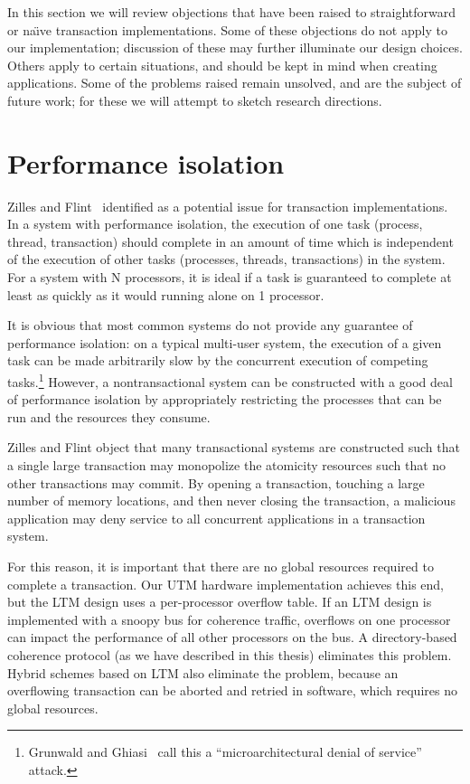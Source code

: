 In this section we will review objections that have been raised to
straightforward or na{\"\i}ve transaction implementations.
Some of these objections do not apply to our implementation;
discussion of these may further illuminate our design choices.
Others apply to certain situations, and should be kept in mind when
creating applications.  Some of the problems raised remain unsolved,
and are the subject of future work; for these we will attempt to sketch
research directions.

\section{Performance isolation}
Zilles and Flint~\cite{ZillesFl05} identified
 as a potential issue for
transaction implementations.  In a system with performance isolation,
the execution of one task (process, thread, transaction) should
complete in an amount of time which is independent of the execution of
other tasks (processes, threads, transactions) in the system.  For
a system with N processors, it is ideal if a task is guaranteed to
complete at least as quickly as it would running alone on 1
processor.

It is obvious that most common systems do not provide any guarantee of
performance isolation: on a typical multi-user system, the execution
of a given task can be made arbitrarily slow by the concurrent
execution of competing tasks.\footnote{Grunwald and
  Ghiasi~\cite{GrunwaldGh02} call this a ``microarchitectural denial
  of service'' attack.}
However, a nontransactional system can
be constructed with a good deal of performance isolation by
appropriately restricting the processes that can be run and the
resources they consume.

Zilles and Flint object that many transactional systems are
constructed such that a single large transaction may monopolize the
atomicity resources such that no other transactions may commit.  By
opening a transaction, touching a large number of memory locations,
and then never closing the transaction, a malicious application may
deny service to all concurrent applications in a transaction system.

For this reason, it is important that there are no global resources
required to complete a transaction.  Our UTM hardware implementation
achieves this end, but the LTM design uses a per-processor overflow
table.  If an LTM design is implemented with a snoopy bus for
coherence traffic, overflows on one processor can impact the
performance of all other processors on the bus.  A directory-based
coherence protocol (as we have described in this thesis) eliminates
this problem.  Hybrid schemes based on LTM also eliminate the problem,
because an overflowing transaction can be aborted and retried in
software, which requires no global resources.

